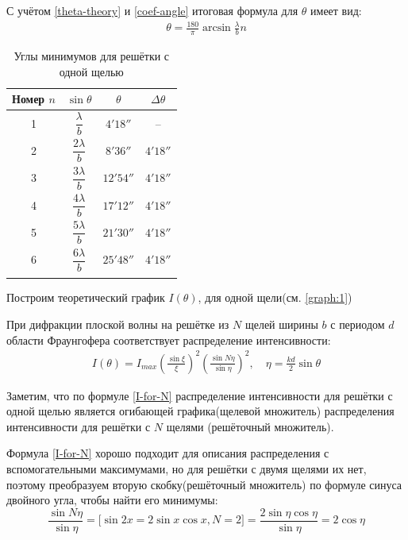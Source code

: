С учётом \cref{theta-theory} и \cref{coef-angle} итоговая формула для $\theta$ имеет вид:
\begin{align}
	\theta = \frac{180}{\pi} \arcsin{ \frac{\lambda}{b} n }
\end{align}


\renewcommand{\arraystretch}{1.8}
\begin{table}[H]
	\centering
	\caption{Углы минимумов для решётки с одной щелью}
	\begin{tabular}{cccc}
		\toprule
		Номер $n$ & $\sin \theta$ & $\theta$ & $\Delta \theta$ \\
		\midrule
		1 & $\dfrac{\lambda}{b}$  & $ 4' 18''$  & -- \\
		2 & $\dfrac{2\lambda}{b}$ & $ 8' 36''$ & $4' 18''$ \\
		3 & $\dfrac{3\lambda}{b}$ & $12' 54''$ & $4' 18''$ \\
		4 & $\dfrac{4\lambda}{b}$ & $17' 12''$ & $4' 18''$ \\
		5 & $\dfrac{5\lambda}{b}$ & $21' 30''$ & $4' 18''$ \\
		6 & $\dfrac{6\lambda}{b}$ & $25' 48''$ & $4' 18''$ \\
		\bottomrule
		\label{tb:1}
	\end{tabular}
\end{table}
\renewcommand{\arraystretch}{1}

Построим теоретический график $I(\theta)$, для одной щели(см. \cref{graph:1})

При дифракции плоской волны на решётке из $N$ щелей ширины $b$ с периодом $d$ области Фраунгофера соответствует распределение интенсивности:
\begin{align} \label{I-for-N}
	I(\theta) = I_{max}\left( \frac{\sin \xi}{\xi} \right)^2 \left( \frac{\sin{N\eta}}{\sin \eta} \right)^2, \quad \eta = \frac{kd}{2} \sin \theta
\end{align}

Заметим, что по формуле \cref{I-for-N} распределение интенсивности для решётки с одной щелью является огибающей графика(щелевой множитель) распределения интенсивности для решётки с $N$ щелями (решёточный множитель). 

Формула \cref{I-for-N} хорошо подходит для описания распределения с вспомогательными максимумами, но для решётки с двумя щелями их нет, поэтому преобразуем вторую скобку(решёточный множитель) по формуле синуса двойного угла, чтобы найти его минимумы: 
\[
\frac{\sin N\eta}{\sin \eta} = 
\big[\sin 2x = 2 \sin x \cos x, N = 2\big] = 
\frac{2 \sin \eta \cos \eta }{ \sin \eta} =
2 \cos \eta
\]

